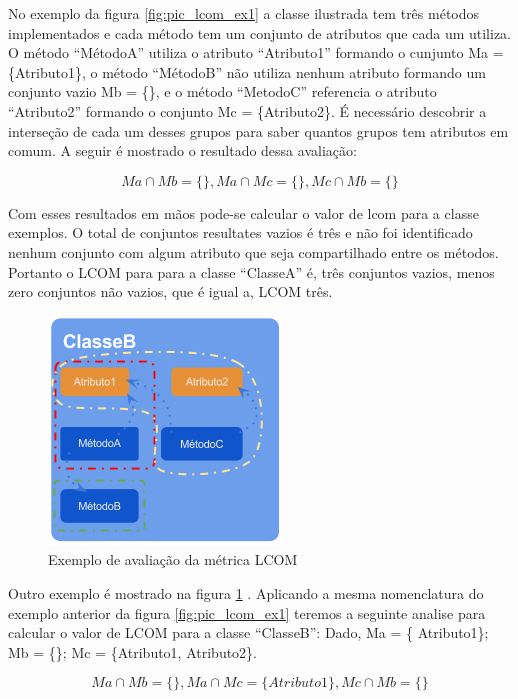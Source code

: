 \begin{description}
No exemplo da figura \ref{fig:pic_lcom_ex1} a classe ilustrada tem três métodos
implementados e cada método tem um conjunto de atributos que cada um utiliza.
O método ``MétodoA'' utiliza o atributo ``Atributo1'' formando o cunjunto Ma =
\{Atributo1\}, o método ``MétodoB'' não utiliza nenhum atributo formando um
conjunto vazio Mb = \{\}, e o método ``MetodoC'' referencia o atributo
``Atributo2'' formando o conjunto Mc = \{Atributo2\}. É necessário descobrir a
interseção de cada um desses grupos para saber quantos grupos tem atributos em
comum. A seguir é mostrado o resultado dessa avaliação:

\[
Ma \cap Mb = \{ \},
Ma \cap Mc = \{ \},
Mc \cap Mb = \{ \}
\]

Com esses resultados em mãos pode-se calcular o valor de lcom para a classe
exemplos. O total de conjuntos resultates vazios é três  e não foi identificado
nenhum conjunto com algum atributo que seja compartilhado entre os métodos.
Portanto o LCOM para para a classe ``ClasseA'' é, três conjuntos vazios, menos
zero conjuntos não vazios, que é igual a, LCOM três.

\begin{figure}[htb]
	\caption{\label{fig:pic_lcom_ex2}Exemplo  de avaliação da métrica LCOM}
	\begin{center}
		\includegraphics[scale=0.8]{img/pic_lcom_ex2.png}
	\end{center}
\end{figure}

Outro exemplo é mostrado na figura \ref{fig:pic_lcom_ex2} . Aplicando a mesma
nomenclatura do exemplo anterior da figura \ref{fig:pic_lcom_ex1} teremos a
seguinte analise para calcular o valor de LCOM para a classe ``ClasseB'': Dado,
Ma = \{ Atributo1\}; Mb = \{\}; Mc = \{Atributo1, Atributo2\}. 

\[
Ma \cap Mb = \{ \},
Ma \cap Mc = \{ Atributo1 \},
Mc \cap Mb = \{ \}
\]


\end{description}
